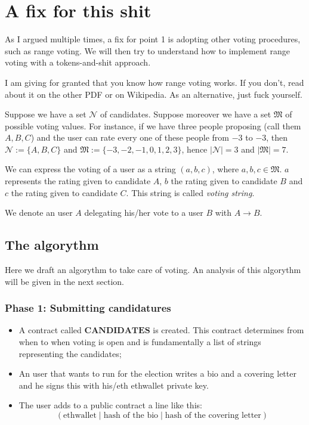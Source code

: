 \documentclass[submission, copyright,creativecommons,sharealike,noncommercial]{eptcs}
\begin{document}
\section{A fix for this shit}
	As I argued multiple times, a fix for point 1 is adopting other voting procedures, such as range voting. We will then try to understand how to implement range voting with a tokens-and-shit approach.
	
	I am giving for granted that you know how range voting works. If you don't, read about it on the other PDF or on Wikipedia. As an alternative, just fuck yourself.
	
	\begin{definition}\label{voting string}
		Suppose we have a set $\mathcal{N}$ of candidates. Suppose moreover we have a set $\mathfrak{M}$ of possible voting values. For instance, if we have three people proposing (call them $A, B, C$) and the user can rate every one of these people from $-3$ to $-3$, then $\mathcal{N} := \{A, B, C\}$ and $\mathfrak{M} := \{-3,-2,-1,0,1,2,3\}$, hence $|\mathcal{N}| = 3$ and $|\mathfrak{M}|=7$.
		
		We can express the voting of a user as a string $(a,b,c)$, where $a,b,c \in \mathfrak{M}$. $a$ represents the rating given to candidate $A$, $b$ the rating given to candidate $B$ and $c$ the rating given to candidate $C$. This string is called \emph{voting string}.
	\end{definition}
	\begin{definition}
 		We denote an user $A$ delegating his/her vote to a user $B$ with $A \to B$.
	\end{definition}
	
	\subsection{The algorythm}
		Here we draft an algorythm to take care of voting. An analysis of this algorythm will be given in the next section.
		\subsubsection{Phase 1: Submitting candidatures}
		
		\begin{itemize}
			\item A contract called $\textbf{CANDIDATES}$ is created. This contract determines from when to when voting is open and is fundamentally a list of strings representing the candidates;
			
			\item An user that wants to run for the election writes a bio and a covering letter and he signs this with his/eth ethwallet private key.
			
			\item The user adds to a public contract a line like this:
			\[
			(\text{ethwallet} \mid \text{hash of the bio} \mid \text{hash of the covering letter})
			\]
		\end{itemize}
\end{document}
